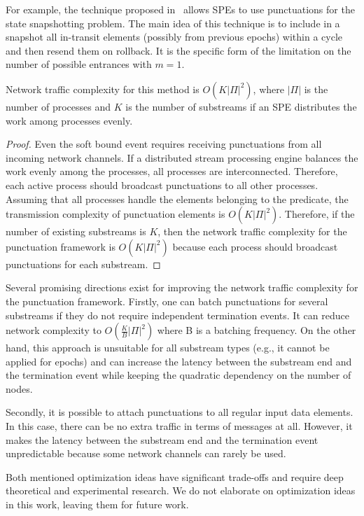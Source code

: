 For example, the technique proposed in~\cite{Carbone:2017:SMA:3137765.3137777} allows SPEs to use punctuations for the state snapshotting problem. The main idea of this technique is to include in a snapshot all in-transit elements (possibly from previous epochs) within a cycle and then resend them on rollback. It is the specific form of the limitation on the number of possible entrances with $m=1$.

\begin{lemma}
Network traffic complexity for this method is $O(K|\Pi|^2)$, where $|\Pi|$ is the number of processes and $K$ is the number of substreams if an SPE distributes the work among processes evenly.
\end{lemma}
\begin{proof}

Even the soft bound event requires receiving punctuations from all incoming network channels. If a distributed stream processing engine balances the work evenly among the processes, all processes are interconnected. Therefore, each active process should broadcast punctuations to all other processes. Assuming that all processes handle the elements belonging to the predicate, the transmission complexity of punctuation elements is $O(K|\Pi|^2)$. Therefore, if the number of existing substreams is $K$, then the network traffic complexity for the punctuation framework is $O(K|\Pi|^2)$ because each process should broadcast punctuations for each substream. 

\end{proof}

Several promising directions exist for improving the network traffic complexity for the punctuation framework. Firstly, one can batch punctuations for several substreams if they do not require independent termination events. It can reduce network complexity to $O(\frac{K}{B}|\Pi|^2)$ where B is a batching frequency. On the other hand, this approach is unsuitable for all substream types (e.g., it cannot be applied for epochs) and can increase the latency between the substream end and the termination event while keeping the quadratic dependency on the number of nodes.

Secondly, it is possible to attach punctuations to all regular input data elements. In this case, there can be no extra traffic in terms of messages at all. However, it makes the latency between the substream end and the termination event unpredictable because some network channels can rarely be used.

Both mentioned optimization ideas have significant trade-offs and require deep theoretical and experimental research. We do not elaborate on optimization ideas in this work, leaving them for future work.
